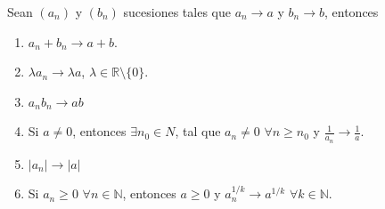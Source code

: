 \documentclass[12pt]{book}
\begin{document}
\begin{prop}{}{}
    Sean $(a_n)$ y $(b_n)$ sucesiones tales que $a_n \to a$ y $b_n \to b$, entonces
    \begin{enumerate}
        \item $a_n+b_n \to a +b $.
        \item $\lambda a_n \to \lambda a$, $\lambda \in \mathbb{R}\setminus \{0\}$.
        \item  $a_n b_n \to ab$
        \item Si $a \neq 0$, entonces $\exists n_0 \in N$, tal que $a_n\neq 0$ $\forall n \geq n_0$ y $\displaystyle \frac{1}{a_n} \to \frac{1}{a}$.
        \item $|a_n| \to |a|$ 
        \item Si $a_n \geq 0$ $\forall n \in \mathbb{N}$, entonces $a \geq 0$ y $a_n^{1/k} \to a^{1/k}$ $\forall k \in \mathbb{N}$.
    \end{enumerate}
\end{prop}
\end{document}
